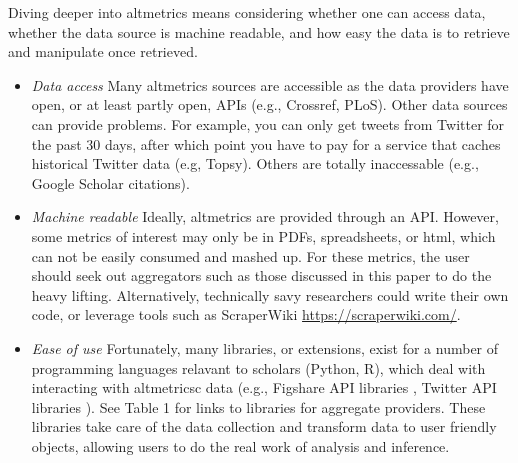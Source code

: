 \documentclass[letterpaper,superscriptaddress,showkeys,longbibliography]{revtex4-1}\usepackage{graphicx, color}
\begin{document}
Diving deeper into altmetrics means considering whether one can access data, whether the data source is machine readable, and how easy the data is to retrieve and manipulate once retrieved. 

\begin{itemize}
  \item \emph{Data access} Many altmetrics sources are accessible as the data providers have open, or at least partly open, APIs (e.g., Crossref, PLoS). Other data sources can provide problems. For example, you can only get tweets from Twitter for the past 30 days, after which point you have to pay for a service that caches historical Twitter data (e.g, Topsy). Others are totally inaccessable (e.g., Google Scholar citations). 
  \item \emph{Machine readable} Ideally, altmetrics are provided through an API. However, some metrics of interest may only be in PDFs, spreadsheets, or html, which can not be easily consumed and mashed up. For these metrics, the user should seek out aggregators such as those discussed in this paper to do the heavy lifting. Alternatively, technically savy researchers could write their own code, or leverage tools such as ScraperWiki \url{https://scraperwiki.com/}. 
  \item \emph{Ease of use} Fortunately, many libraries, or extensions, exist for a number of programming languages relavant to scholars (Python, R), which deal with interacting with altmetricsc data (e.g., Figshare API libraries \cite{figshare}, Twitter API libraries \cite{twitter}). See Table 1 for links to libraries for aggregate providers. These libraries take care of the data collection and transform data to user friendly objects, allowing users to do the real work of analysis and inference.
\end{itemize}

\end{document}
